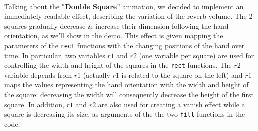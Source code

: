 \documentclass[a4paper,12pt]{report}
\begin{document}
\\Talking about the \textbf{"Double Square"} animation, we decided to implement an immediately readable effect, describing the variation of the reverb volume. The 2 squares gradually decrease \& increase their dimension following the hand orientation, as we'll show in the demo. This effect is given mapping the parameters of the \texttt{rect} functions with the changing positions of the hand over time. In particular, two variables $r1$ and $r2$ (one variable per square) are used for controlling the width and height of the squares in the \texttt{rect} functions. The $r2$ variable depends from $r1$ (actually $r1$ is related to the square on the left) and $r1$ maps the values representing the hand orientation with the width and height of the square: decreasing the width will consequently decrease the height of the first square. In addition, $r1$ and $r2$ are also used for creating a vanish effect while a square is decreasing its size, as arguments of the the two \texttt{fill} functions in the code.
\end{document}
